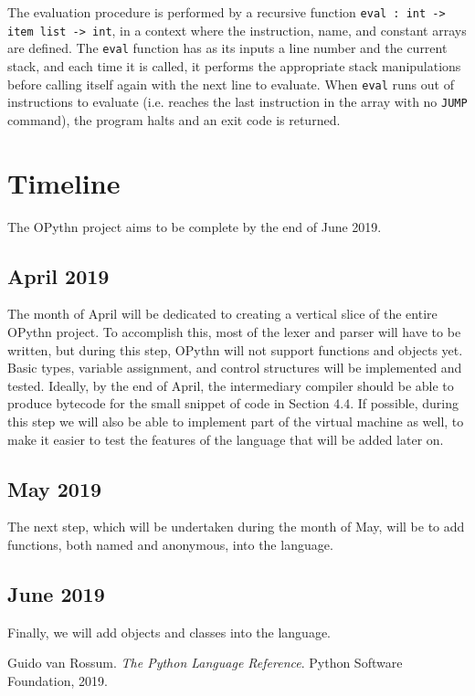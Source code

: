 \documentclass[11pt, twoside]{article}
\begin{document}
    \indent The evaluation procedure is performed by a recursive function \texttt{eval : int -> item list -> int}, in a context where the instruction, name, and constant arrays are defined. The \texttt{eval} function has as its inputs a line number and the current stack, and each time it is called, it performs the appropriate stack manipulations before calling itself again with the next line to evaluate. When \texttt{eval} runs out of instructions to evaluate (i.e. reaches the last instruction in the array with no \texttt{JUMP} command), the program halts and an exit code is returned.
    
    \section{Timeline}
    The OPythn project aims to be complete by the end of June 2019.
    \subsection{April 2019}
    The month of April will be dedicated to creating a vertical slice of the entire OPythn project. To accomplish this, most of the lexer and parser will have to be written, but during this step, OPythn will not support functions and objects yet. Basic types, variable assignment, and control structures will be implemented and tested. Ideally, by the end of April, the intermediary compiler should be able to produce bytecode for the small snippet of code in Section 4.4. If possible, during this step we will also be able to implement part of the virtual machine as well, to make it easier to test the features of the language that will be added later on.
    \subsection{May 2019}
    The next step, which will be undertaken during the month of May, will be to add functions, both named and anonymous, into the language.
    \subsection{June 2019}
    Finally, we will add objects and classes into the language.
    

\begin{thebibliography}{1}
     Guido van Rossum. \textit{The Python Language Reference}. Python Software Foundation, 2019.
\end{thebibliography}
\end{document}
